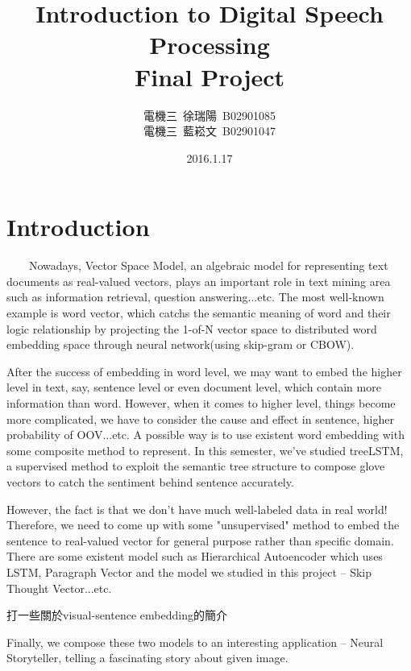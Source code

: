 \documentclass{article}
\title{Introduction to Digital Speech Processing\\
Final Project} %
\author{電機三~徐瑞陽~B02901085 \\
電機三~藍崧文~B02901047} %
\date{2016.1.17} %
\begin{document}
\maketitle
\section{Introduction}
		\par~~~~Nowadays, Vector Space Model, an algebraic model for representing text documents as real-valued vectors, plays an important role in text mining area such as information retrieval, question answering...etc. The most well-known example is word vector\cite{NIPS2013_5021}, which catchs the semantic meaning of word and their logic relationship by projecting the 1-of-N vector space to distributed word embedding space through neural network(using skip-gram or CBOW).
\newline

	\par After the success of embedding in word level, we may want to embed the higher level in text, say, sentence level or even document level, which contain more information than word. However, when it comes to higher level, things become more complicated, we have to consider the cause and effect in sentence, higher probability of OOV...etc. A possible way is to use existent word embedding with some composite method to represent. In this semester, we've studied treeLSTM, a supervised method to exploit the semantic tree structure to compose glove vectors to catch the sentiment behind sentence accurately.
\newline

	\par However, the fact is that we don't have much well-labeled data in real world! Therefore, we need to come up with some "unsupervised" method to embed the sentence to real-valued vector for general purpose rather than specific domain. There are some existent model such as Hierarchical Autoencoder\cite{li2015hierarchical} which uses LSTM, Paragraph Vector\cite{DBLP:journals/corr/LeM14} and the model we studied in this project -- Skip Thought Vector\cite{kiros2015skip}...etc.
\newline

	\par 打一些關於visual-sentence embedding的簡介
\newline

	\par Finally, we compose these two models to an interesting application -- Neural Storyteller, telling a fascinating story about given image.
\end{document}
